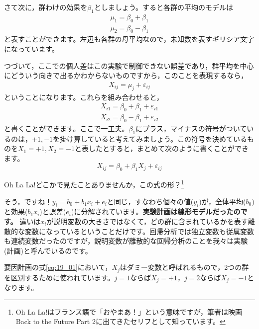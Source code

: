 \documentclass{ltjbook}
\begin{document}
さて次に，群わけの効果を$\beta_1$としましょう。すると各群の平均のモデルは
\begin{align}
\mu_1= \beta_0 + \beta_1
\end{align}
\begin{align}
\mu_2 = \beta_0  -\beta_1
\end{align}
と表すことができます。左辺も各群の母平均なので，未知数を表すギリシア文字になっています。

つづいて，ここでの個人差はこの実験で制御できない誤差であり，群平均を中心にどういう向きで出るかわからないものですから，このことを表現するなら，
\begin{align}
X_{ij} = \mu_j + \varepsilon_{ij}
\end{align}
ということになります。これらを組み合わせると，
\begin{align}
X_{i1} = \beta_0 + \beta_1 + \varepsilon_{i1}
\end{align}
\begin{align}
X_{i2} = \beta_0 - \beta_1 + \varepsilon_{i2}
\end{align}
と書くことができます。ここで一工夫。$\beta_1$にプラス，マイナスの符号がついているのは，$+1,-1$を掛け算していると考えてみましょう。この符号を決めているものを$X_{1}=+1,X_{2}=-1$と表したとすると，まとめて次のように書くことができます。
\begin{equation}
	\label{eq:19_01}
	X_{ij} = \beta_0 +  \beta_1 X_{j} + \varepsilon_{ij}
\end{equation}


Oh La La!どこかで見たことありませんか，この式の形？\footnote{Oh La La!はフランス語で「おやまあ！」という意味ですが，筆者は映画Back to the Future Part 2に出てきたセリフとして知っています。}


そう，ですね！$y_i=b_0 + b_1x_i + e_i$と同じ，すなわち個々の値($y_i$)が，全体平均($b_0$)と効果($b_1x_i$)と誤差($e_i$)に分解されています。\textbf{実験計画は線形モデルだったのです。}\label{experiment_is_lm}
違いは$x_i$が説明変数の大きさではなくて，どの群に含まれているかを表す離散的な変数になっているということだけです。回帰分析では独立変数も従属変数も連続変数だったのですが，説明変数が離散的な回帰分析のことを我々は実験(計画)と呼んでいるのです。

要因計画の式\ref{eq:19_01}において，$X_j$はダミー変数と呼ばれるもので，2つの群を区別するために使われています。$j=1$ならば$X_j=+1$，$j=2$ならば$X_j=-1$となります。
\end{document}
